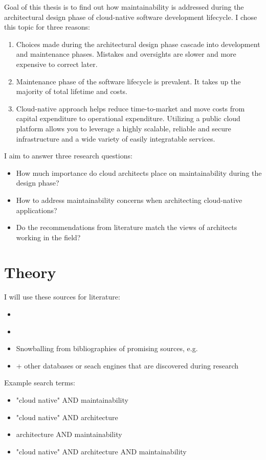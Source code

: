 \documentclass[utf8,english]{gradu3}
\begin{document}
Goal of this thesis is to find out how maintainability is addressed during the
architectural design phase of cloud-native software development lifecycle.
I chose this topic for three reasons:
\begin{enumerate}
  \item Choices made during the architectural design phase cascade into
        development and maintenance phases. Mistakes and oversights are
        slower and more expensive to correct later.
  \item Maintenance phase of the software lifecycle is prevalent.
        It takes up the majority of total lifetime and costs.
  \item Cloud-native approach helps reduce time-to-market and move costs from
        capital expenditure to operational expenditure. Utilizing a public cloud
        platform allows you to leverage a highly scalable, reliable and secure
        infrastructure and a wide variety of easily integratable services.
\end{enumerate}

I aim to answer three research questions:
\begin{itemize}
  \item How much importance do cloud architects place on maintainability during
        the design phase?
  \item How to address maintainability concerns when architecting cloud-native
        applications?
  \item Do the recommendations from literature match the views of architects
        working in the field?
\end{itemize}

\chapter{Theory}
I will use these sources for literature:
\begin{itemize}
  \item \textcite{jykdok}
  \item \textcite{google-scholar}
  \item Snowballing from bibliographies of promising sources, e.g. \textcite{thesis-time-tracking}
  \item + other databases or seach engines that are discovered during research
\end{itemize}

Example search terms:
\begin{itemize}
  \item "cloud native" AND maintainability
  \item "cloud native" AND architecture
  \item architecture AND maintainability
  \item "cloud native" AND architecture AND maintainability
\end{itemize}
\end{document}
